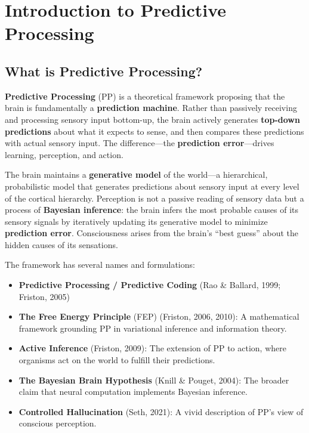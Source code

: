 \documentclass[11pt,a4paper]{report}
\begin{document}
\chapter{Introduction to Predictive Processing}

\section{What is Predictive Processing?}

\textbf{Predictive Processing} (PP) is a theoretical framework proposing that the brain is fundamentally a \textbf{prediction machine}. Rather than passively receiving and processing sensory input bottom-up, the brain actively generates \textbf{top-down predictions} about what it expects to sense, and then compares these predictions with actual sensory input. The difference---the \textbf{prediction error}---drives learning, perception, and action.

\begin{definitionbox}
The brain maintains a \textbf{generative model} of the world---a hierarchical, probabilistic model that generates predictions about sensory input at every level of the cortical hierarchy. Perception is not a passive reading of sensory data but a process of \textbf{Bayesian inference}: the brain infers the most probable causes of its sensory signals by iteratively updating its generative model to minimize \textbf{prediction error}. Consciousness arises from the brain's ``best guess'' about the hidden causes of its sensations.
\end{definitionbox}

The framework has several names and formulations:
\begin{itemize}[leftmargin=1.5em]
  \item \textbf{Predictive Processing / Predictive Coding} (Rao \& Ballard, 1999; Friston, 2005)
  \item \textbf{The Free Energy Principle} (FEP) (Friston, 2006, 2010): A mathematical framework grounding PP in variational inference and information theory.
  \item \textbf{Active Inference} (Friston, 2009): The extension of PP to action, where organisms act on the world to fulfill their predictions.
  \item \textbf{The Bayesian Brain Hypothesis} (Knill \& Pouget, 2004): The broader claim that neural computation implements Bayesian inference.
  \item \textbf{Controlled Hallucination} (Seth, 2021): A vivid description of PP's view of conscious perception.
\end{itemize}
\end{document}
